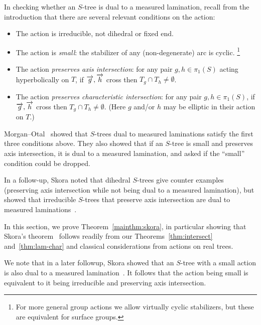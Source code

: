 In checking whether an $S$-tree is dual to a measured
lamination, recall from the introduction that there are several
relevant conditions on the action:
\begin{itemize}
\item The action is irreducible, not dihedral or fixed end.
\item The action is \emph{small}: the stabilizer of any
  (non-degenerate) arc is cyclic.%
  \footnote{For more general group actions we allow virtually cyclic
    stabilizers, but these are equivalent for surface groups.}
\item The action  \emph{preserves axis intersection}: for any pair
  $g,h \in \pi_1(S)$ acting hyperbolically on $T$, if
  $\overrightarrow{g},\overrightarrow{h}$ cross then $T_g \cap T_h \neq \emptyset$.
\item The action  \emph{preserves characteristic intersection}: for any pair
  $g,h \in \pi_1(S)$, if
  $\overrightarrow{g},\overrightarrow{h}$ cross then $T_g \cap T_h \neq \emptyset$. (Here
  $g$ and/or $h$ may be elliptic in their action on $T$.)
\end{itemize}
Morgan--Otal~\cite{MO93:RelativeGrowths} showed that $S$-trees dual to measured laminations
satisfy the first three conditions above. They also showed that if an $S$-tree
is small and preserves axis intersection, it is dual to a measured
lamination, and asked if the ``small'' condition could be dropped.

In a follow-up, Skora noted that dihedral
$S$-trees give counter examples (preserving axis intersection while not
being dual to a measured lamination), but showed that irreducible
$S$-trees that preserve axis intersection are dual to measured
laminations~\cite{Sko90:GeometricAction}.

In this section, we prove Theorem~\ref{mainthm:skora}, in particular showing
that Skora's theorem~\cite{Sko90:GeometricAction} follows readily from
our Theorems~\ref{thm:intersect} and~\ref{thm:lam-char} and
classical considerations
from actions on real trees.

We note that in a later followup,  Skora showed that an $S$-tree with
a small action is also
dual to a measured lamination~\cite{Sk96:Splittings}.
It follows that the action being small is equivalent to it being irreducible and preserving axis intersection.

